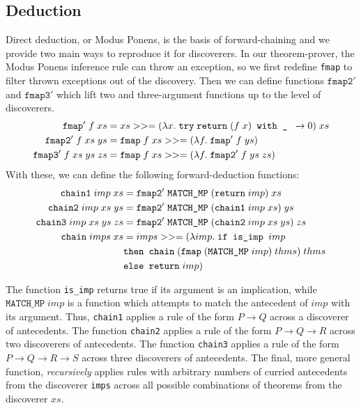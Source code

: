 \subsection{Deduction}
Direct deduction, or Modus Ponens, is the basis of forward-chaining and we provide two main ways to reproduce it for discoverers. In our theorem-prover, the Modus Ponens inference rule can throw an exception, so we first redefine \texttt{fmap} to filter thrown exceptions out of the discovery. Then we can define functions $\texttt{fmap2}'$ and $\texttt{fmap3}'$ which lift two and three-argument functions up to the level of discoverers.
\begin{align*}
\texttt{fmap}'\;f\;xs &= xs >>= (\lambda x.\;\texttt{try}\; \texttt{return}\;(f\;x)  \texttt{ with \_ } \rightarrow 0)\;xs\\
\texttt{fmap2}'\;f\;xs\;ys &= \texttt{fmap}\;f\;xs >>= (\lambda f.\;\texttt{fmap}'\;f\;ys)\\
\texttt{fmap3}'\;f\;xs\;ys\;zs &= \texttt{fmap}\;f\;xs >>= (\lambda f.\;\texttt{fmap2}'\;f\;ys\;zs)
\end{align*}
With these, we can define the following forward-deduction functions:
\begin{align*}
\texttt{chain1}\;imp\;xs &= \texttt{fmap2}'\; \texttt{MATCH\_MP}\; (\texttt{return}\;imp)\;xs \\
\texttt{chain2}\;imp\;xs\;ys &= \texttt{fmap2}'\; \texttt{MATCH\_MP}\; (\texttt{chain1}\; imp\;xs)\;ys\\
\texttt{chain3}\;imp\;xs\;ys\;zs &= \texttt{fmap2}'\; \texttt{MATCH\_MP}\; (\texttt{chain2}\;imp\;xs\;ys)\;zs\\
\texttt{chain}\;imps\;xs &= imps >>= (\lambda imp.\;\texttt{if is\_imp } imp\\ &\texttt{then } \texttt{chain}\;(\texttt{fmap}\;(\texttt{MATCH\_MP}\;imp)\;thms)\;thms\\
&\texttt{else } \texttt{return}\; imp)
\end{align*}

The function \texttt{is\_imp} returns true if its argument is an implication, while $\texttt{MATCH\_MP}\;imp$ is a function which attempts to match the antecedent of $imp$ with its argument. Thus, \texttt{chain1} applies a rule of the form $P \rightarrow Q$ across a discoverer of antecedents. The function \texttt{chain2} applies a rule of the form $P \rightarrow Q \rightarrow R$ across two discoverers of antecedents. The function \texttt{chain3} applies a rule of the form $P \rightarrow Q \rightarrow R \rightarrow S$ across three discoverers of antecedents. The final, more general function, \emph{recursively} applies rules with arbitrary numbers of curried antecedents from the discoverer \texttt{imps} across all possible combinations of theorems from the discoverer $xs$.%

